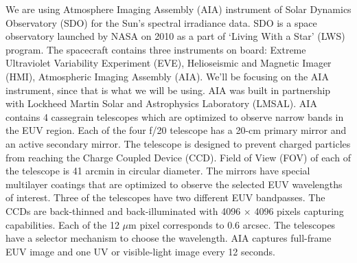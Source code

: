 We are using Atmosphere Imaging Assembly (AIA) instrument of Solar Dynamics Observatory (SDO) for the Sun's spectral irradiance data. SDO is a space observatory launched by NASA on 2010 as a part of `Living With a Star' (LWS) program. The spacecraft contains three instruments on board: Extreme Ultraviolet Variability Experiment (EVE), Helioseismic and Magnetic Imager (HMI), Atmospheric Imaging Assembly (AIA). We'll be focusing on the AIA instrument, since that is what we will be using. AIA was built in partnership with Lockheed Martin Solar and Astrophysics Laboratory (LMSAL). AIA contains 4 cassegrain telescopes which are optimized to observe narrow bands in the EUV region. Each of the four f/20 telescope has a 20-cm primary mirror and an active secondary mirror. The telescope is designed to prevent charged particles from reaching the Charge Coupled Device (CCD). Field of View (FOV) of each of the telescope is 41 arcmin in circular diameter. The mirrors have special multilayer coatings that are optimized to observe the selected EUV wavelengths of interest. Three of the telescopes have two different EUV bandpasses. The CCDs are back-thinned and back-illuminated with 4096 $\times$ 4096 pixels capturing capabilities. Each of the 12 $\mu$m pixel corresponds to 0.6 arcsec. The telescopes have a selector mechanism to choose the wavelength. AIA captures full-frame EUV image and one UV or visible-light image every 12 seconds. \citep{Lemen2011}

